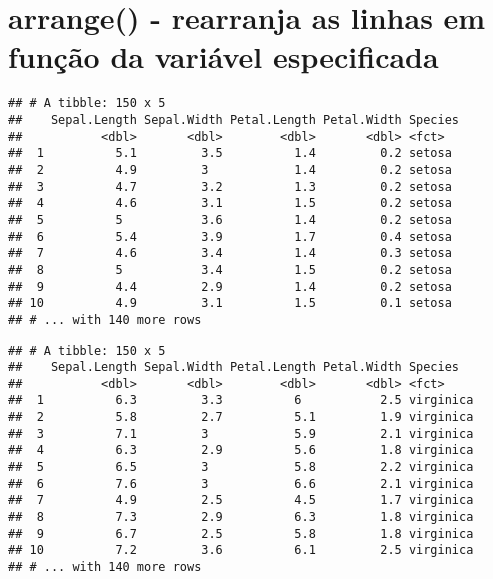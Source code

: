 \documentclass[]{book}
\newenvironment{Shaded}{\begin{snugshade}}{\end{snugshade}}
\newcommand{\KeywordTok}[1]{\textcolor[rgb]{0.13,0.29,0.53}{\textbf{#1}}}
\newcommand{\NormalTok}[1]{#1}
\newcommand{\OperatorTok}[1]{\textcolor[rgb]{0.81,0.36,0.00}{\textbf{#1}}}
\newcommand{\StringTok}[1]{\textcolor[rgb]{0.31,0.60,0.02}{#1}}
\begin{document}
\hypertarget{arrange---rearranja-as-linhas-em-funuxe7uxe3o-da-variuxe1vel-especificada}{%
\section{arrange() - rearranja as linhas em função da variável especificada}\label{arrange---rearranja-as-linhas-em-funuxe7uxe3o-da-variuxe1vel-especificada}}

\begin{Shaded}
\end{Shaded}

\begin{verbatim}
## # A tibble: 150 x 5
##    Sepal.Length Sepal.Width Petal.Length Petal.Width Species
##           <dbl>       <dbl>        <dbl>       <dbl> <fct>  
##  1          5.1         3.5          1.4         0.2 setosa 
##  2          4.9         3            1.4         0.2 setosa 
##  3          4.7         3.2          1.3         0.2 setosa 
##  4          4.6         3.1          1.5         0.2 setosa 
##  5          5           3.6          1.4         0.2 setosa 
##  6          5.4         3.9          1.7         0.4 setosa 
##  7          4.6         3.4          1.4         0.3 setosa 
##  8          5           3.4          1.5         0.2 setosa 
##  9          4.4         2.9          1.4         0.2 setosa 
## 10          4.9         3.1          1.5         0.1 setosa 
## # ... with 140 more rows
\end{verbatim}

\begin{Shaded}
\end{Shaded}

\begin{verbatim}
## # A tibble: 150 x 5
##    Sepal.Length Sepal.Width Petal.Length Petal.Width Species  
##           <dbl>       <dbl>        <dbl>       <dbl> <fct>    
##  1          6.3         3.3          6           2.5 virginica
##  2          5.8         2.7          5.1         1.9 virginica
##  3          7.1         3            5.9         2.1 virginica
##  4          6.3         2.9          5.6         1.8 virginica
##  5          6.5         3            5.8         2.2 virginica
##  6          7.6         3            6.6         2.1 virginica
##  7          4.9         2.5          4.5         1.7 virginica
##  8          7.3         2.9          6.3         1.8 virginica
##  9          6.7         2.5          5.8         1.8 virginica
## 10          7.2         3.6          6.1         2.5 virginica
## # ... with 140 more rows
\end{verbatim}
\end{document}
